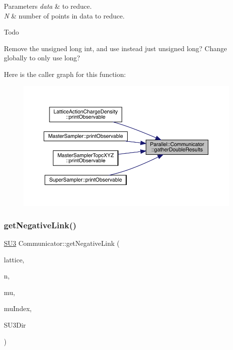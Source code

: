 \begin{DoxyParams}{Parameters}
{\em data} & to reduce. \\
\hline
{\em N} & number of points in data to reduce.\\
\hline
\end{DoxyParams}
\begin{DoxyRefDesc}{Todo}
\item[\mbox{\hyperlink{todo__todo000008}{Todo}}]Remove the unsigned long int, and use instead just unsigned long? Change globally to only use long? \end{DoxyRefDesc}
Here is the caller graph for this function\+:\nopagebreak
\begin{figure}[H]
\begin{center}
\leavevmode
\includegraphics[width=350pt]{class_parallel_1_1_communicator_ae5739683ff54a7c39af6e37920e70ea5_icgraph}
\end{center}
\end{figure}
\mbox{\label{class_parallel_1_1_communicator_ae843d16f4aed13d5b5179a05b717ec88}} 
\subsubsection{\texorpdfstring{getNegativeLink()}{getNegativeLink()}}
{\footnotesize\ttfamily \mbox{\hyperlink{class_s_u3}{S\+U3}} Communicator\+::get\+Negative\+Link (\begin{DoxyParamCaption}\item[{\mbox{\hyperlink{class_lattice}{Lattice}}$<$ \mbox{\hyperlink{class_s_u3}{S\+U3}} $>$ $\ast$}]{lattice,  }\item[{std\+::vector$<$ int $>$}]{n,  }\item[{int}]{mu,  }\item[{int $\ast$}]{mu\+Index,  }\item[{int}]{S\+U3\+Dir }\end{DoxyParamCaption})\hspace{0.3cm}{\ttfamily [static]}}



